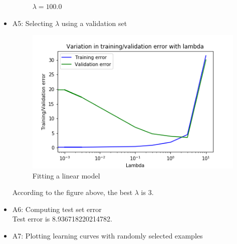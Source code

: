 \documentclass{article}
\begin{document}
\begin{itemize}
\begin{figure}[htbp]
{\begin{minipage}[t]{0.5\textwidth}
    \end{minipage}
    }
    \caption{$\lambda = 100.0$}
\end{figure}
\pagebreak
\item A5: Selecting $\lambda$ using a validation set
\begin{figure}[htbp]
	\centering
	\includegraphics[scale = 0.7]{validation_error_with_lambda.png}
	\caption{Fitting a linear model}
\end{figure}
According to the figure above, the best $\lambda$ is 3.\\
\item A6: Computing test set error\\
Test error is 8.936718220214782.\\
\item A7: Plotting learning curves with randomly selected examples\\

\end{itemize}
\end{document}
